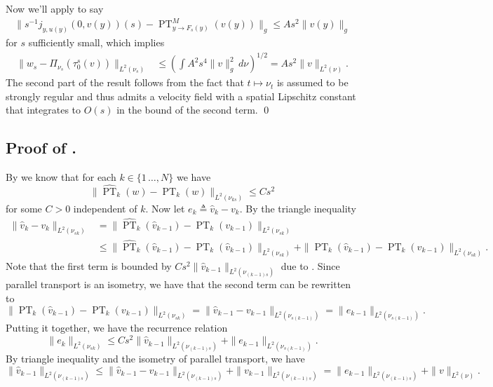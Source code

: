 \documentclass[11pt]{article}
\newcommand{\man}{M}
\newcommand{\PT}{\operatorname{PT}}
\begin{document}
Now we'll apply  to say 
\begin{align*}
    \|s^{-1}j_{y, u(y)}\left(0, v(y)\right)(s)  - {\PT}^{\man}_{y \rightarrow F_s(y)}(v(y))\|_g \leq As^2\|v(y)\|_g
\end{align*}
for $s$ sufficiently small, which implies 
\begin{align*}
    \|w_s - \Pi_{\nu_s}(\tau_0^s(v))\|_{L^2(\nu_s)} &\leq \left(\int A^2s^4\|v\|_g^2 \,d\nu\right)^{1/2}  = As^2\|v\|_{L^2(\nu)}.
\end{align*}
The second part of the result follows from the fact that $t \mapsto \nu_t$ is assumed to be strongly regular and thus admits a velocity field with a spatial Lipschitz constant that integrates to $O(s)$ in the bound of the second term.
\qed{}

\subsection{Proof of .} \label{sec: proof of full approximation of parallel transport along regular curves}
By  we know that for each $k \in \{1\, \dots , N\}$ we have \[\|\widehat{{\PT}}_k(w) - {\PT}_k(w)\|_{L^2(\nu_{ks})} \leq Cs^2\]
for some $C > 0$ independent of $k$. Now let $e_k \triangleq \hat v_k - v_k.$ By the triangle inequality
\begin{align*}
    \|\hat v_k - v_k\|_{L^2(\nu_{sk})}  &= \|\widehat{{\PT}}_k(\hat v_{k-1}) - {\PT}_k(v_{k-1})\|_{L^2(\nu_{sk})}\\ &\leq \|\widehat{{\PT}}_k(\hat v_{k-1}) - {\PT}_k(\hat v_{k-1})\|_{L^2(\nu_{sk})} + \|{\PT}_k(\hat v_{k-1}) - {\PT}_k(v_{k-1})\|_{L^2(\nu_{sk})}.
\end{align*}
Note that the first term is bounded by $Cs^2\|\hat v_{k - 1}\|_{L^2(\nu_{(k-1)s})}$ due to . Since parallel transport is an isometry, we have that the second term can be rewritten to
\[\|{\PT}_k(\hat v_{k-1}) - {\PT}_k(v_{k-1})\|_{L^2(\nu_{sk})} = \|\hat v_{k-1} - v_{k-1}\|_{L^2(\nu_{s(k-1)})} = \|e_{k-1}\|_{L^2(\nu_{s(k-1)})}.\]
Putting it together, we have the recurrence relation 
\[\|e_k\|_{L^2(\nu_{sk})} \leq Cs^2\|\hat v_{k - 1}\|_{L^2(\nu_{(k-1)s})} + \|e_{k-1}\|_{L^2(\nu_{s(k-1)})}.\]
By triangle inequality and the isometry of parallel transport, we have 
\[\|\hat v_{k-1}\|_{L^2(\nu_{(k-1)s})} \leq \|\hat v_{k-1} - v_{k - 1}\|_{L^2(\nu_{(k-1)s})} + \|v_{k - 1}\|_{L^2(\nu_{(k-1)s})} = \|e_{k-1}\|_{L^2(\nu_{(k-1)s})} + \|v\|_{L^2(\nu)}.\]
\end{document}
